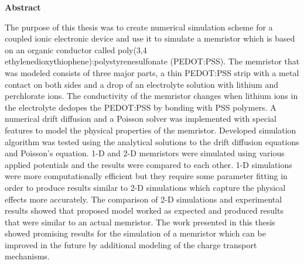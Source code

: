 \documentclass[11pt, a4paper, oneside]{Thesis} %
\begin{document}
\Large
\textbf{Abstract}
\newline
\begin{doublespace}
The purpose of this thesis was to create numerical simulation scheme for a coupled ionic electronic device and use it to simulate a memristor which is based on an organic conductor called poly(3,4 ethylenedioxythiophene):polystyrenesulfonate (PEDOT:PSS). The memristor that was modeled consists of three major parts, a thin PEDOT:PSS strip with a metal contact on both sides and a drop of an electrolyte solution with lithium and perchlorate ions. The conductivity of the memristor changes when lithium ions in the electrolyte dedopes the PEDOT:PSS by bonding with PSS polymers. A numerical drift diffusion and a Poisson solver was implemented with special features to model the physical properties of the memristor. Developed simulation algorithm was tested using the analytical solutions to the drift diffusion equations and Poisson's equation. 1-D and 2-D memristors were simulated using various applied potentials and the results were compared to each other. 1-D simulations were more computationally efficient but they require some parameter fitting in order to produce results similar to 2-D simulations which capture the physical effects more accurately. The comparison of 2-D simulations and experimental results showed that proposed model worked as expected and produced results that were similar to an actual memristor. The work presented in this thesis showed promising results for the simulation of a memristor which can be improved in the future by additional modeling of the charge transport mechanisms.
\end{doublespace}
\normalsize
\begin{doublespace}

\end{doublespace}



\newpage %



\clearpage %
\end{document}
